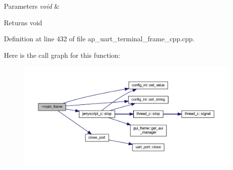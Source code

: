 \begin{DoxyParams}{Parameters}
{\em void} & \\
\hline
\end{DoxyParams}
\begin{DoxyReturn}{Returns}
void 
\end{DoxyReturn}


Definition at line 432 of file ap\+\_\+uart\+\_\+terminal\+\_\+frame\+\_\+cpp.\+cpp.

Here is the call graph for this function\+:\nopagebreak
\begin{figure}[H]
\begin{center}
\leavevmode
\includegraphics[width=350pt]{group___u_a_r_t__terminal_gaf3820c86d5633619d8e1baddfcbb5042_cgraph}
\end{center}
\end{figure}
